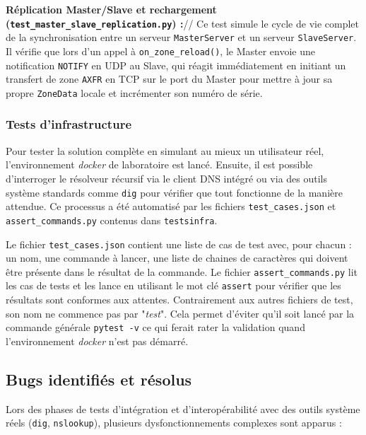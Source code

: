 \textbf{Réplication Master/Slave et rechargement (\texttt{test\_master\_slave\_replication.py}) :}//
Ce test simule le cycle de vie complet de la synchronisation entre un serveur \texttt{MasterServer} et un serveur \texttt{SlaveServer}. Il vérifie que lors d'un appel à \texttt{on\_zone\_reload()}, le Master envoie une notification \texttt{NOTIFY} en UDP au Slave, qui réagit immédiatement en initiant un transfert de zone \texttt{AXFR} en TCP sur le port du Master pour mettre à jour sa propre \texttt{ZoneData} locale et incrémenter son numéro de série.


\subsubsection{Tests d'infrastructure}
Pour tester la solution complète en simulant au mieux un utilisateur réel, l'environnement \textit{docker} de laboratoire est lancé.
Ensuite, il est possible d'interroger le résolveur récursif via le client DNS intégré ou via des outils système standards comme \texttt{dig} pour vérifier que tout fonctionne de la manière attendue.
Ce processus a été automatisé par les fichiers \texttt{test\_cases.json} et \texttt{assert\_commands.py} contenus dans \texttt{tests\/infra}.

Le fichier \texttt{test\_cases.json} contient une liste de cas de test avec, pour chacun : un nom, une commande à lancer, une liste de chaines de caractères qui doivent être présente dans le résultat de la commande.
Le fichier \texttt{assert\_commands.py} lit les cas de tests et les lance en utilisant le mot clé \texttt{assert} pour vérifier que les résultats sont conformes aux attentes.
Contrairement aux autres fichiers de test, son nom ne commence pas par "\textit{test}".
Cela permet d'éviter qu'il soit lancé par la commande générale \texttt{pytest -v} ce qui ferait rater la validation quand l'environnement \textit{docker} n'est pas démarré.

\subsection{Bugs identifiés et résolus}
Lors des phases de tests d'intégration et d'interopérabilité avec des outils système réels (\texttt{dig}, \texttt{nslookup}), plusieurs dysfonctionnements complexes sont apparus :

